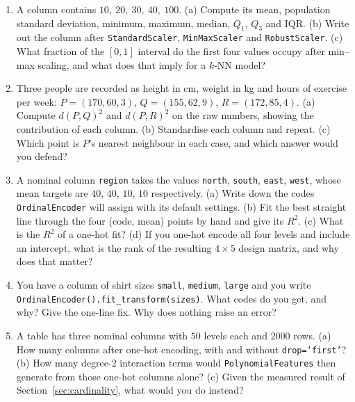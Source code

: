 \documentclass[11pt]{article}
\begin{document}
\begin{enumerate}[leftmargin=*]
  \item\label{q:scale} A column contains $10,\ 20,\ 30,\ 40,\ 100$. (a)
    Compute its mean, population standard deviation, minimum, maximum, median,
    $Q_1$, $Q_3$ and IQR. (b) Write out the column after
    \texttt{StandardScaler}, \texttt{MinMaxScaler} and \texttt{RobustScaler}.
    (c) What fraction of the $[0,1]$ interval do the first four values occupy
    after min--max scaling, and what does that imply for a $k$-NN model?

  \item\label{q:dist} Three people are recorded as height in cm, weight in kg
    and hours of exercise per week:
    $P = (170, 60, 3)$, $Q = (155, 62, 9)$, $R = (172, 85, 4)$. (a) Compute
    $d(P,Q)^2$ and $d(P,R)^2$ on the raw numbers, showing the contribution of
    each column. (b) Standardise each column and repeat. (c) Which point is
    $P$'s nearest neighbour in each case, and which answer would you defend?

  \item\label{q:encode} A nominal column \texttt{region} takes the values
    \texttt{north}, \texttt{south}, \texttt{east}, \texttt{west}, whose mean
    targets are $40$, $40$, $10$, $10$ respectively. (a) Write down the codes
    \texttt{OrdinalEncoder} will assign with its default settings. (b) Fit the
    best straight line through the four (code, mean) points by hand and give
    its $R^2$. (c) What is the $R^2$ of a one-hot fit? (d) If you one-hot
    encode all four levels and include an intercept, what is the rank of the
    resulting $4 \times 5$ design matrix, and why does that matter?

  \item\label{q:ordinal} You have a column of shirt sizes
    \texttt{small}, \texttt{medium}, \texttt{large} and you write
    \texttt{OrdinalEncoder().fit\_transform(sizes)}. What codes do you get, and
    why? Give the one-line fix. Why does nothing raise an error?

  \item\label{q:card} A table has three nominal columns with $50$ levels each
    and $2000$ rows. (a) How many columns after one-hot encoding, with and
    without \texttt{drop='first'}? (b) How many degree-2 interaction terms
    would \texttt{PolynomialFeatures} then generate from those one-hot columns
    alone? (c) Given the measured result of Section~\ref{sec:cardinality},
    what would you do instead?


\end{enumerate}
\end{document}
